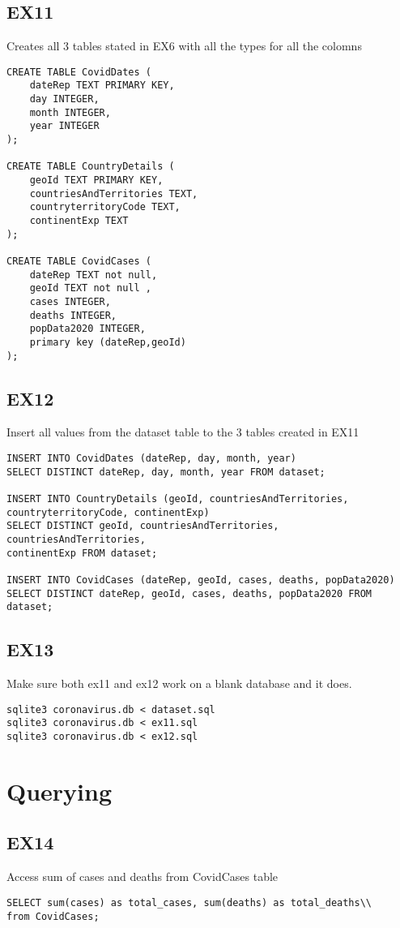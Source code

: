 \documentclass{article}
\begin{document}
\subsection{EX11}
Creates all 3 tables stated in EX6 with all the types for all the colomns 
\begin{verbatim}
CREATE TABLE CovidDates (
    dateRep TEXT PRIMARY KEY,
    day INTEGER,
    month INTEGER,
    year INTEGER
);

CREATE TABLE CountryDetails (
    geoId TEXT PRIMARY KEY,
    countriesAndTerritories TEXT,
    countryterritoryCode TEXT,
    continentExp TEXT
);

CREATE TABLE CovidCases (
    dateRep TEXT not null,
    geoId TEXT not null ,
    cases INTEGER,
    deaths INTEGER,
    popData2020 INTEGER,
    primary key (dateRep,geoId)
);
\end{verbatim}

\subsection{EX12}
Insert all values from the dataset table to the 3 tables created in EX11
\begin{verbatim}
INSERT INTO CovidDates (dateRep, day, month, year)
SELECT DISTINCT dateRep, day, month, year FROM dataset;

INSERT INTO CountryDetails (geoId, countriesAndTerritories, 
countryterritoryCode, continentExp)
SELECT DISTINCT geoId, countriesAndTerritories, countriesAndTerritories, 
continentExp FROM dataset;

INSERT INTO CovidCases (dateRep, geoId, cases, deaths, popData2020)
SELECT DISTINCT dateRep, geoId, cases, deaths, popData2020 FROM dataset;
\end{verbatim}

\subsection{EX13}
Make sure both ex11 and ex12 work on a blank database and it does.
\begin{verbatim}
sqlite3 coronavirus.db < dataset.sql
sqlite3 coronavirus.db < ex11.sql
sqlite3 coronavirus.db < ex12.sql 
\end{verbatim}
\section{Querying}
\subsection{EX14}
Access sum of cases and deaths from CovidCases table
\begin{verbatim}
SELECT sum(cases) as total_cases, sum(deaths) as total_deaths\\
from CovidCases;
\end{verbatim}
\end{document}
